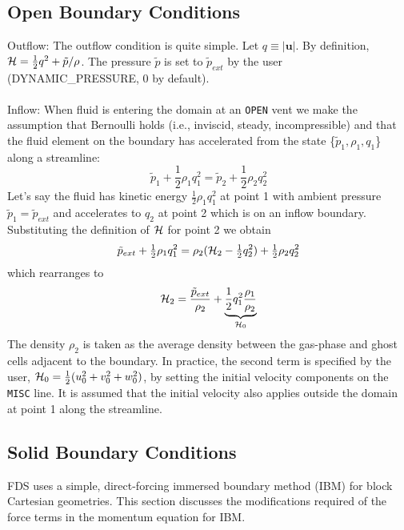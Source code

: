 \subsection{Open Boundary Conditions}

Outflow: The outflow condition is quite simple.
Let $q \equiv |\mathbf{u}|$. By definition, ${\cal H} = \frac{1}{2}q^2 + \tilde{p}/\rho$.
The pressure $\tilde{p}$ is set to $\tilde{p}_{ext}$ by the user ({\ct DYNAMIC\_PRESSURE}, 0 by default).
\\
\\
Inflow: When fluid is entering the domain at an {\tt OPEN} vent we make the assumption that
Bernoulli holds (i.e., inviscid, steady, incompressible) and that the fluid element on the boundary has
accelerated from the state \{$\tilde{p}_1,\rho_1,q_1$\} along a streamline:
\begin{equation}
\tilde{p}_1 + \mbox{$\frac{1}{2}$}\rho_1 q_1^2 = \tilde{p}_2 + \mbox{$\frac{1}{2}$}\rho_2 q_2^2
\end{equation}
Let's say the fluid has kinetic energy $\frac{1}{2}\rho_1 q_1^2$ at point 1 with
ambient pressure $\tilde{p}_1 = \tilde{p}_{ext}$ and accelerates to $q_2$ at point 2 which is on an inflow boundary.
Substituting the definition of ${\cal H}$ for point 2 we obtain
\begin{equation}
\tilde{p}_{ext} + \mbox{$\frac{1}{2}$}\rho_1 q_1^2 = \rho_2({\cal H}_2 - \mbox{$\frac{1}{2}$} q_2^2) +
\mbox{$\frac{1}{2}$} \rho_2 q_2^2
\end{equation}
which rearranges to
\begin{equation}
{\cal H}_2 = \frac{\tilde{p}_{ext}}{\rho_2} + \underbrace{\frac{1}{2}q_1^2 \frac{\rho_1}{\rho_2}}_{{\cal H}_0}
\end{equation}
The density $\rho_2$ is taken as the average density between the gas-phase and ghost cells adjacent to the boundary. In practice, the second term is specified by the user, ${\cal H}_0 = \frac{1}{2}(u_0^2 + v_0^2 + w_0^2)$, by setting the initial velocity components on the {\tt MISC} line.  It is assumed that the initial velocity also applies outside the domain at point 1 along the streamline.



\subsection{Solid Boundary Conditions}

FDS uses a simple, direct-forcing immersed boundary method (IBM) \cite{Fadlun:2000} for block Cartesian geometries.  This section discusses the modifications required of the force terms in the momentum equation for IBM.

